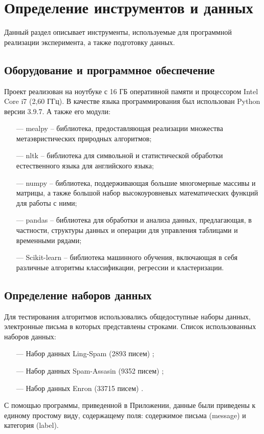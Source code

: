 \section{Определение инструментов и данных}

Данный раздел описывает инструменты, используемые для программной реализации эксперимента, а
также подготовку данных.

\subsection{Оборудование и программное обеспечение}

Проект реализован на ноутбуке с 16 ГБ оперативной памяти и процессором Intel Core i7 (2,60 ГГц).
В качестве языка программирования был использован Python версии 3.9.7. А также его модули:

\begin{itemize}
    \item[—] mealpy -- библиотека, предоставляющая реализации множества метаэвристических природных алгоритмов;
    \item[—] nltk -- библиотека для символьной и статистической обработки естественного языка для английского языка;
    \item[—] numpy -- библиотека, поддерживающая большие многомерные массивы и матрицы, а также большой набор высокоуровневых математических функций для работы с ними;
    \item[—] pandas -- библиотека для обработки и анализа данных, предлагающая, в частности, структуры данных и операции для управления таблицами и временными рядами;
    \item[—] Scikit-learn -- библиотека машинного обучения, включающая в себя различные алгоритмы классификации,
        регрессии и кластеризации.
\end{itemize}

\subsection{Определение наборов данных}

Для тестирования алгоритмов использовались общедоступные наборы данных, электронные
письма в которых представлены строками.
Список использованных наборов данных:

\begin{itemize}
    \item[—] Набор данных Ling-Spam (2893 писем) \cite{LingSpam};
    \item[—] Набор данных Spam-Assasin (9352 писем) \cite{SpamAssasin};
    \item[—] Набор данных Enron (33715 писем) \cite{Enron}.
\end{itemize}
С помощью программы, приведенной в Приложении, данные были приведены к единому простому виду, содержащему поля:
содержимое письма (message) и категория (label).

